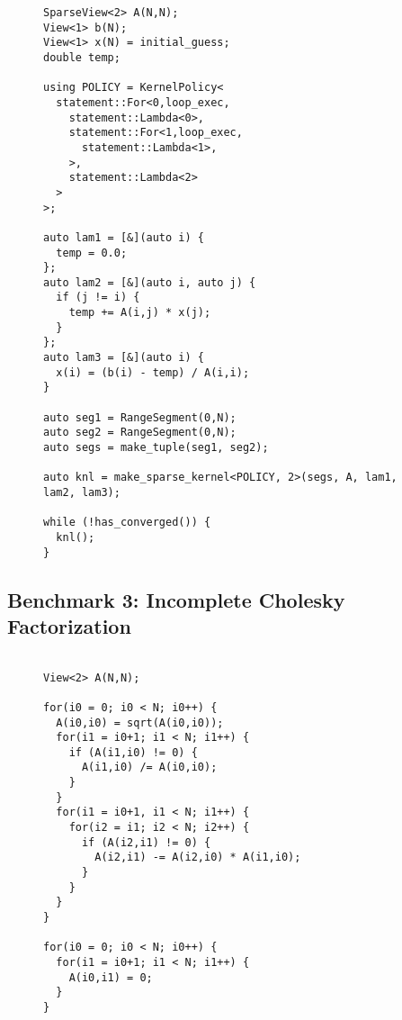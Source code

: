 \begin{figure}
\begin{lstlisting}[caption={\sparseraja{} version of Gauss-Seidel iteration},label=SparseRAJAGauSei]
SparseView<2> A(N,N);
View<1> b(N);
View<1> x(N) = initial_guess;
double temp;

using POLICY = KernelPolicy<
  statement::For<0,loop_exec,
    statement::Lambda<0>,
    statement::For<1,loop_exec,
      statement::Lambda<1>,
    >,
    statement::Lambda<2>
  >
>;

auto lam1 = [&](auto i) {
  temp = 0.0;
};
auto lam2 = [&](auto i, auto j) {
  if (j != i) {
    temp += A(i,j) * x(j);
  }
};
auto lam3 = [&](auto i) {
  x(i) = (b(i) - temp) / A(i,i);
}

auto seg1 = RangeSegment(0,N);
auto seg2 = RangeSegment(0,N);
auto segs = make_tuple(seg1, seg2);

auto knl = make_sparse_kernel<POLICY, 2>(segs, A, lam1, lam2, lam3);

while (!has_converged()) {
  knl();
}
\end{lstlisting}
\end{figure}

\subsection{Benchmark 3: Incomplete Cholesky Factorization}
\begin{figure}
\begin{lstlisting}[caption={C++ reference implementation of incomplete Cholesky factorization.},label=CppInCholFact]

View<2> A(N,N);   

for(i0 = 0; i0 < N; i0++) {
  A(i0,i0) = sqrt(A(i0,i0));
  for(i1 = i0+1; i1 < N; i1++) {
    if (A(i1,i0) != 0) {
      A(i1,i0) /= A(i0,i0);
    }
  }
  for(i1 = i0+1, i1 < N; i1++) {
    for(i2 = i1; i2 < N; i2++) {
      if (A(i2,i1) != 0) {
        A(i2,i1) -= A(i2,i0) * A(i1,i0);
      }
    }
  }
}

for(i0 = 0; i0 < N; i0++) {
  for(i1 = i0+1; i1 < N; i1++) {
    A(i0,i1) = 0;
  }
}
\end{lstlisting}
\end{figure}






